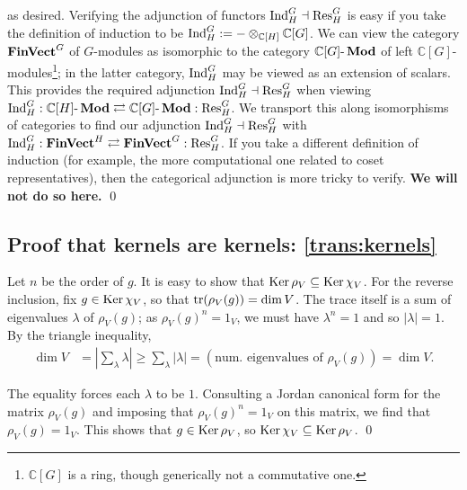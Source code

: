 as desired. Verifying the adjunction of functors $\operatorname{Ind}_H^G \dashv \operatorname{Res}^G_H$ is easy if you take the definition of induction to be $\operatorname{Ind}_H^G := {-} \otimes_{\mathbb{C}[H]} \mathbb{C}[G]$. We can view the category $\operatorname{\mathbf{FinVect}}^G$ of $G$-modules as isomorphic to the category $\mathbb{C}[G]\text{-}\operatorname{\mathbf{Mod}}$ of left $\mathbb{C}[G]$-modules\footnote{$\mathbb{C}[G]$ is a ring, though generically not a commutative one.}; in the latter category, $\operatorname{Ind}_H^G$ may be viewed as an extension of scalars. This provides the required adjunction $\operatorname{Ind}_H^G \dashv \operatorname{Res}^G_H$ when viewing $\operatorname{Ind}_H^G : \mathbb{C}[H]\text{-}\operatorname{\mathbf{Mod}} \rightleftarrows \mathbb{C}[G]\text{-}\operatorname{\mathbf{Mod}} : \operatorname{Res}^G_H$. We transport this along isomorphisms of categories to find our adjunction $\operatorname{Ind}_H^G \dashv \operatorname{Res}^G_H$ with $\operatorname{Ind}_H^G : \operatorname{\mathbf{FinVect}}^H \rightleftarrows \operatorname{\mathbf{FinVect}}^G : \operatorname{Res}^G_H$. If you take a different definition of induction (for example, the more computational one related to coset representatives), then the categorical adjunction is more tricky to verify. \textbf{We will not do so here.} \qed

\subsection{Proof that kernels are kernels: \ref{trans:kernels}} %
\label{proof:kernels-are-kernels}
\pan Let $n$ be the order of $g$. It is easy to show that $\operatorname{Ker} \rho_V \subseteq \operatorname{Ker} \chi_V$. For the reverse inclusion, fix $g \in \operatorname{Ker} \chi_V$, so that $\operatorname{tr} (\rho_V (g)) = \dim V$. The trace itself is a sum of eigenvalues $\lambda$ of $\rho_V (g)$; as $\rho_V (g)^n = 1_V$, we must have $\lambda^n = 1$ and so $\lvert \lambda \rvert = 1$. By the triangle inequality,
\begin{align*}
  \dim V
  &= \left\lvert
    \sum_{\lambda} \lambda
    \right\rvert
  \geq \sum_{\lambda} \lvert \lambda \rvert
  = (\text{num. eigenvalues of } \rho_V (g))
  = \dim V
  .
\end{align*}
\par The equality forces each $\lambda$ to be $1$. Consulting a Jordan canonical form for the matrix $\rho_V (g)$ and imposing that $\rho_V (g)^n = 1_V$ on this matrix, we find that $\rho_V (g) = 1_V$. This shows that $g \in \operatorname{Ker} \rho_V$, so $\operatorname{Ker} \chi_V \subseteq \operatorname{Ker} \rho_V$. \qed

